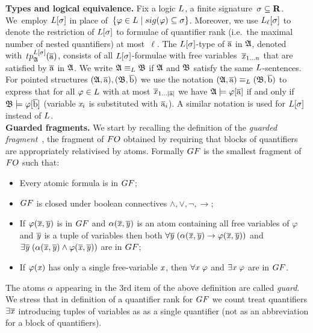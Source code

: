 \documentclass[a4paper, UKenglish, cleveref, numberwithinsect, autoref]{lipics-v2021}
\begin{document}
\noindent \textbf{Types and logical equivalence.}
Fix a logic $\logicL$, a finite signature~$\sigma \subseteq \mathbf{R}$. 
We~employ $\logicL[\sigma]$ in place of~$\{ \varphi \in \logicL \mid \sig(\varphi) \subseteq \sigma \}$.
Moreover, we use $\logicL_\ell[\sigma]$ to denote the restriction of $\logicL[\sigma]$ to formulae of quantifier rank (i.e.\ the maximal number of nested quantifiers) at most~$\ell$.  
%
The $\logicL[\sigma]$-type of $\overline{\mathrm{a}}$ in ${\mathfrak{A}}$, denoted with~$\tp{\logicL[\sigma]}{\str{A}}{\elemtuplea}$, consists of all $\logicL[\sigma]$-formulae with free variables~$\overline{\mathit{x}}_{1\ldots n}$ that are satisfied by $\overline{\mathrm{a}}$ in ${\mathfrak{A}}$.
We write $\str{A} \equiv_\logicL \str{B}$ if ${\mathfrak{A}}$ and ${\mathfrak{B}}$ satisfy the same $\logicL$-sentences.
For pointed structures $({\mathfrak{A}}, \overline{\mathrm{a}}), ({\mathfrak{B}}, \overline{\mathrm{b}})$ we use the notation $(\str{A}, \elemtuplea) \equiv_\logicL (\str{B}, \elemtupleb)$ to express that for all $\varphi \in \logicL$ with at most $\overline{\mathit{x}}_{1\ldots|\overline{\mathrm{a}}|}$ we have ${\mathfrak{A}} \models \varphi[\overline{\mathrm{a}}]$ if and only if ${\mathfrak{B}} \models \varphi[\overline{\mathrm{b}}]$ (variable $\mathit{x}_i$ is substituted with $\overline{\mathrm{a}}_i$). 
A similar notation is used for $\logicL[\sigma]$ instead of $\logicL$.\\

\noindent \textbf{Guarded fragments.}
We start by recalling the definition of the \emph{guarded fragment}~\cite{AndrekaNB98}, \ie the fragment of $\FO$ obtained by requiring that blocks of quantifiers are appropriately relativised by atoms.
Formally $\GF$ is the smallest fragment of $\FO$  such that:
\begin{itemize}\itemsep0em
    \item Every atomic formula is in $\GF$;
    \item $\GF$ is closed under boolean connectives $\land, \lor, \neg, \to$;
    \item If $\varphi(\overline{\mathit{x}}, \overline{\mathit{y}})$ is in $\GF$ and $\alpha(\overline{\mathit{x}}, \overline{\mathit{y}})$ is an atom containing all free variables of $\varphi$ and $\overline{\mathit{y}}$ is a tuple of variables then both $\forall{\overline{\mathit{y}}} \; (\alpha(\overline{\mathit{x}}, \overline{\mathit{y}}) \to \varphi(\overline{\mathit{x}}, \overline{\mathit{y}}))$ and $\exists{\overline{\mathit{y}}} \; (\alpha(\overline{\mathit{x}}, \overline{\mathit{y}}) \land \varphi(\overline{\mathit{x}}, \overline{\mathit{y}}))$ are in $\GF$; 
    \item If $\varphi(\mathit{x})$ has only a single free-variable $\mathit{x}$, then $\forall{\mathit{x}}\; \varphi$ and $\exists{\mathit{x}}\; \varphi$ are in $\GF$.
\end{itemize}
The atoms $\alpha$ appearing in the 3rd item of the above definition are called \emph{guard}.
We stress that in definition of a quantifier rank for $\GF$ we count treat quantifiers $\exists{\overline{\mathit{x}}}$ introducing tuples of variables as as a single quantifier (not as an abbreviation for a block of quantifiers).
\end{document}
